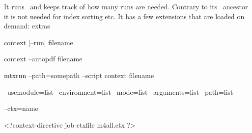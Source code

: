     \stopitemize

\stopsubject

\startsubject[title=The \quote {context} script]

\startitemize[packed]

    \startitem It runs \CONTEXT\ and keeps track of how many runs are needed. \stopitem \FlushStep
    \startitem Contrary to its \MKII\ ancestor it is not needed for index sorting etc. \stopitem \FlushStep
    \startitem It has a few extensions that are loaded on demand: extras \stopitem \FlushStep

\stopitemize

\stopsubject

\StopSteps

\page

\StartSteps

\startsubject[title=A regular run]

    \starttyping
    context [--run] filename
    \stoptyping \FlushStep

\stopsubject

\startsubject[title=Running from an editor]

    \starttyping
    context --autopdf filename
    \stoptyping \FlushStep

\stopsubject

\startsubject[title=Running from an service]

    \starttyping
    mtxrun --path=somepath --script context filename
    \stoptyping \FlushStep

\stopsubject

\StopSteps

\page

\StartSteps

\startsubject[title=Controlling the rendering]

    \starttyping
    --usemodule=list
    --environment=list
    --mode=list
    --arguments=list
    --path=list
    \stoptyping \FlushStep

\stopsubject

\startsubject[title=Controlling with ctx files]

    \starttyping
    --ctx=name
    \stoptyping \FlushStep

\stopsubject

\startsubject[title=Also in preamble]

    \starttyping
    <?context-directive job ctxfile m4all.ctx ?>
    \stoptyping \FlushStep

\stopsubject

